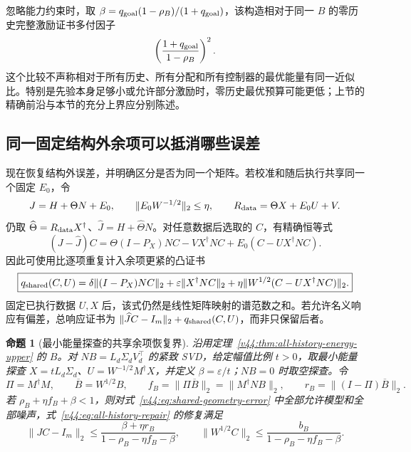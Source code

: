 \documentclass[11pt,a4paper]{article}
\numberwithin{equation}{section}
\newtheorem{proposition}[theorem]{命题}
\theoremstyle{definition}
\begin{document}
忽略能力约束时，取 $\beta=q_{\rm goal}(1-\rho_B)/(1+q_{\rm goal})$，该构造相对于同一 $B$ 的零历史完整激励证书多付因子
\begin{equation}
 \left(\frac{1+q_{\rm goal}}{1-\rho_B}\right)^2.
\end{equation}
这个比较不声称相对于所有历史、所有分配和所有控制器的最优能量有同一近似比。特别是先验本身足够小或允许部分激励时，零历史最优预算可能更低；上节的精确前沿与本节的充分上界应分别陈述。

\subsection{同一固定结构外余项可以抵消哪些误差}

现在恢复结构外误差，并明确区分是否为同一个矩阵。若校准和随后执行共享同一个固定 $E_0$，令
\begin{equation}
 J=H+\Theta N+E_0,\qquad
 \|E_0W^{-1/2}\|_2\le\eta,
 \qquad R_{\rm data}=\Theta X+E_0U+V.
 \label{v44:eq:shared-geometry-error}
\end{equation}
仍取 $\widehat\Theta=R_{\rm data}X^\dagger$、$\widehat J=H+\widehat\Theta N$。对任意数据后选取的 $C$，有精确恒等式
\begin{equation}
 \boxed{
 (J-\widehat J)C
 =\Theta(I-P_X)NC-VX^\dagger NC
       +E_0(C-UX^\dagger NC).}
 \label{v44:eq:shared-remainder-identity}
\end{equation}
因此可使用比逐项重复计入余项更紧的凸证书
\begin{equation}
 \boxed{
 q_{\rm shared}(C,U)
 =\delta\|(I-P_X)NC\|_2
 +\varepsilon\|X^\dagger NC\|_2
 +\eta\|W^{1/2}(C-UX^\dagger NC)\|_2.}
 \label{v44:eq:shared-remainder-certificate}
\end{equation}
固定已执行数据 $U,X$ 后，该式仍然是线性矩阵映射的谱范数之和。若允许名义响应有偏差，总响应证书为
$\|\widehat JC-I_m\|_2+q_{\rm shared}(C,U)$，而非只保留后者。

\begin{proposition}[最小能量探查的共享余项恢复界]
\label{v44:prop:shared-remainder-all-history}
沿用定理~\ref{v44:thm:all-history-energy-upper} 的 $B$。对 $NB=L_d\Sigma_dV_d^\top$ 的紧致 SVD，给定幅值比例 $t>0$，取最小能量探查 $X=tL_d\Sigma_d$、$U=W^{-1/2}M^\dagger X$，并定义 $\beta=\varepsilon/t$；$NB=0$ 时取空探查。令
\begin{equation}
 \Pi=M^\dagger M,\qquad
 \overline B=W^{1/2}B,\qquad
 f_B=\|\Pi\overline B\|_2=\|M^\dagger NB\|_2,
 \qquad r_B=\|(I-\Pi)\overline B\|_2.
\end{equation}
若 $\rho_B+\eta f_B+\beta<1$，则对式~\eqref{v44:eq:shared-geometry-error} 中全部允许模型和全部噪声，式~\eqref{v44:eq:all-history-repair} 的修复满足
\begin{equation}
 \boxed{
 \|JC-I_m\|_2
 \le\frac{\beta+\eta r_B}{1-\rho_B-\eta f_B-\beta},
 \qquad
 \|W^{1/2}C\|_2
 \le\frac{b_B}{1-\rho_B-\eta f_B-\beta}.}
 \label{v44:eq:shared-remainder-gain}
\end{equation}
\end{proposition}
\end{document}
